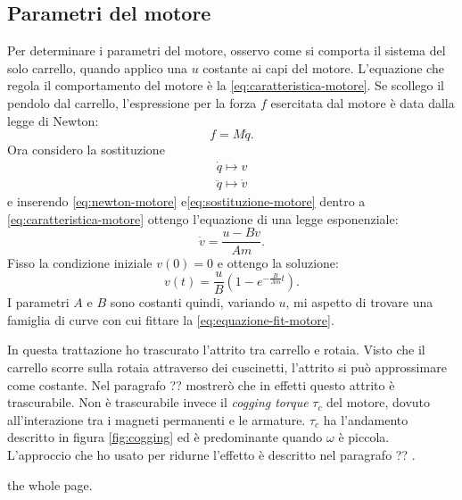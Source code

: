 \subsection{Parametri del motore}
\label{subsec:parametri-motore}
Per determinare i parametri del motore, osservo come si comporta il sistema del solo
carrello, quando applico una \ddp $u$ costante ai capi del motore.
L'equazione che regola il comportamento del motore è la \eqref{eq:caratteristica-motore}.
Se scollego il pendolo dal carrello, l'espressione per la forza $f$
esercitata dal motore è data dalla legge di Newton:
\begin{equation}
    f = M \ddot q.
    \label{eq:newton-motore}
\end{equation}
Ora considero la sostituzione
\begin{equation}
    \begin{aligned}
    \dot q \mapsto v \\
    \ddot q \mapsto \dot v
    \end{aligned}
    \label{eq:sostituzione-motore}
\end{equation}
e inserendo \eqref{eq:newton-motore} e\eqref{eq:sostituzione-motore} dentro a \eqref{eq:caratteristica-motore}
ottengo l'equazione di una legge esponenziale:
\begin{equation*}
    \dot v = \frac{u - B v} {Am}.
\end{equation*}
Fisso la condizione iniziale $v(0) = 0$ e ottengo la soluzione:
\begin{equation}
    v(t) = \frac u B \left(1 - e^{-\frac B {Am} t}\right).
    \label{eq:equazione-fit-motore}
\end{equation}
I parametri $A$ e $B$ sono costanti quindi, variando $u$, mi aspetto di trovare
una famiglia di curve con cui fittare la \eqref{eq:equazione-fit-motore}.

In questa trattazione ho trascurato l'attrito tra carrello e rotaia.
Visto che il carrello scorre sulla rotaia attraverso dei cuscinetti,
l'attrito si può approssimare come costante.
Nel paragrafo ??  mostrerò che in effetti questo attrito
è trascurabile.
Non è trascurabile invece il \emph{cogging torque} $\tau_c$ del motore,
dovuto all'interazione tra i magneti permanenti e le armature. $\tau_c$ ha
l'andamento descritto in figura \ref{fig:cogging} ed è predominante quando $\omega$ è
piccola.
L'approccio che ho usato per ridurne l'effetto è descritto nel paragrafo ?? .

the whole page.
\makeatletter
\setlength{\@fptop}{0pt}
\makeatother

